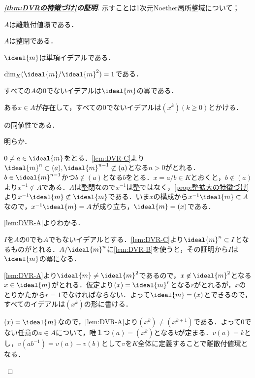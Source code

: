 \begin{proof}[\textbf{\ref{thm:DVRの特徴づけ}の証明}]
	示すことは1次元Noether局所整域について；
	\begin{sakura}
		\item $A$は離散付値環である．
		\item $A$は整閉である．
		\item $\ideal{m}$は単項イデアルである．
		\item $\dim_K (\ideal{m}/\ideal{m}^2)=1$である．
		\item すべての$A$の0でないイデアルは$\ideal{m}$の冪である．
		\item ある$x\in A$が存在して，すべての0でないイデアルは$(x^k) (k\geq0)$とかける．
	\end{sakura}
	の同値性である．
	\begin{eqv}[6]
		\item 明らか．
		\item $0\neq a\in\ideal{m}$をとる．\ref{lem:DVR-C}より$\ideal{m}^n\subset(a),\ideal{m}^{n-1}\not\subset(a)$となる$n>0$がとれる．$b\in\ideal{m}^{n-1}$かつ$b\not\in(a)$となる$b$をとる．$x=a/b\in K$とおくと，$b\not\in(a)$より$x^{-1}\not\in A$である．$A$は整閉なので$x^{-1}$は整ではなく，\ref{prop:整拡大の特徴づけ}より$x^{-1}\ideal{m}\not\subset\ideal{m}$である．いま$x$の構成から$x^{-1}\ideal{m}\subset A$なので，$x^{-1}\ideal{m}=A$が成り立ち，$\ideal{m}=(x)$である．
		
		\item \ref{lem:DVR-A}よりわかる．
		
		\item $I$を$A$の$0$でも$A$でもないイデアルとする．\ref{lem:DVR-C}より$\ideal{m}^n\subset I$となるものがとれる．$A/\ideal{m}^n$に\ref{lem:DVR-B}を使うと，その証明から$I$は$\ideal{m}$の冪になる．
		
		\item \ref{lem:DVR-A}より$\ideal{m}\neq\ideal{m}^2$であるので，$x\not\in\ideal{m}^2$となる$x\in\ideal{m}$がとれる．仮定より$(x)=\ideal{m}^r$となる$r$がとれるが，$x$のとりかたから$r=1$でなければならない．よって$\ideal{m}=(x)$とできるので，すべてのイデアルは$(x^k)$の形に書ける．
		
		\item $(x)=\ideal{m}$なので，\ref{lem:DVR-A}より$(x^k)\neq(x^{k+1})$である．よって0でない任意の$a\in A$について，唯１つ$(a)=(x^k)$となる$k$が定まる．$v(a)=k$とし，$v(ab^{-1})=v(a)-v(b)$として$v$を$K$全体に定義することで離散付値環となる．
	\end{eqv}
\end{proof}

